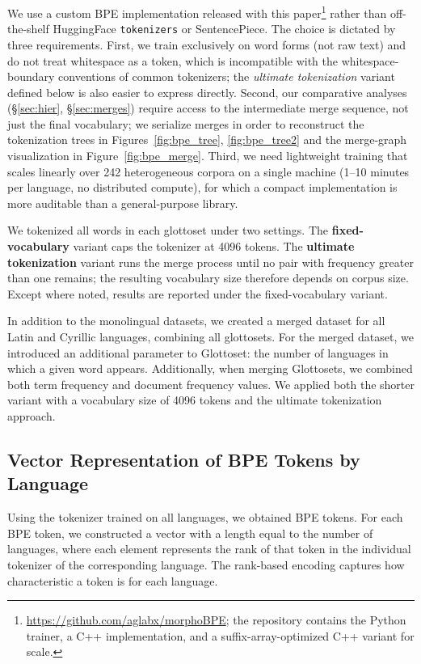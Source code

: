 \documentclass[11pt]{article}
\begin{document}
We use a custom BPE implementation released with this paper\footnote{\url{https://github.com/aglabx/morphoBPE}; the repository contains the Python trainer, a C++ implementation, and a suffix-array-optimized C++ variant for scale.} rather than off-the-shelf HuggingFace \texttt{tokenizers} or SentencePiece. The choice is dictated by three requirements. First, we train exclusively on word forms (not raw text) and do not treat whitespace as a token, which is incompatible with the whitespace-boundary conventions of common tokenizers; the \emph{ultimate tokenization} variant defined below is also easier to express directly. Second, our comparative analyses (\S\ref{sec:hier}, \S\ref{sec:merges}) require access to the intermediate merge sequence, not just the final vocabulary; we serialize merges in order to reconstruct the tokenization trees in Figures~\ref{fig:bpe_tree}, \ref{fig:bpe_tree2} and the merge-graph visualization in Figure~\ref{fig:bpe_merge}. Third, we need lightweight training that scales linearly over 242 heterogeneous corpora on a single machine (1--10 minutes per language, no distributed compute), for which a compact implementation is more auditable than a general-purpose library.

We tokenized all words in each glottoset under two settings. The \textbf{fixed-vocabulary} variant caps the tokenizer at 4096 tokens. The \textbf{ultimate tokenization} variant runs the merge process until no pair with frequency greater than one remains; the resulting vocabulary size therefore depends on corpus size. Except where noted, results are reported under the fixed-vocabulary variant.

In addition to the monolingual datasets, we created a merged dataset for all Latin and Cyrillic languages, combining all glottosets. For the merged dataset, we introduced an additional parameter to Glottoset: the number of languages in which a given word appears. Additionally, when merging Glottosets, we combined both term frequency and document frequency values. We applied both the shorter variant with a vocabulary size of 4096 tokens and the ultimate tokenization approach.

\subsection{Vector Representation of BPE Tokens by Language}
\label{sec:vectors}

Using the tokenizer trained on all languages, we obtained BPE tokens. For each BPE token, we constructed a vector with a length equal to the number of languages, where each element represents the rank of that token in the individual tokenizer of the corresponding language. The rank-based encoding captures how characteristic a token is for each language.
\end{document}
